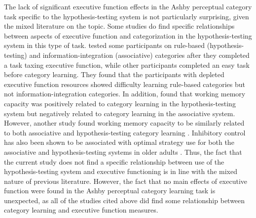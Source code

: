 \documentclass[../dissertation.tex]{subfiles}
\begin{document}
	The lack of significant executive function effects in the Ashby perceptual category task specific to the hypothesis-testing system is not particularly surprising, given the mixed literature on the topic. Some studies do find specific relationships between aspects of executive function and categorization in the hypothesis-testing system in this type of task. \citet{Minda2015} tested some participants on rule-based (hypothesis-testing) and information-integration (associative) categories after they completed a task taxing executive function, while other participants completed an easy task before category learning. They found that the participants with depleted executive function resources showed difficulty learning rule-based categories but not information-integration categories. In addition, \citet{DeCaro2008} found that working memory capacity was positively related to category learning in the hypothesis-testing system but negatively related to category learning in the associative system. However, another study found working memory capacity to be similarly related to both associative and hypothesis-testing category learning \citep{Lewandowsky2012}. Inhibitory control has also been shown to be associated with optimal strategy use for both the associative and hypothesis-testing systems in older adults \citep{Maddox2010}. Thus, the fact that the current study does not find a specific relationship between use of the hypothesis-testing system and executive functioning is in line with the mixed nature of previous literature. However, the fact that no main effects of executive function were found in the Ashby perceptual category learning task is unexpected, as all of the studies cited above did find some relationship between category learning and executive function measures.  \par
	
\end{document}
